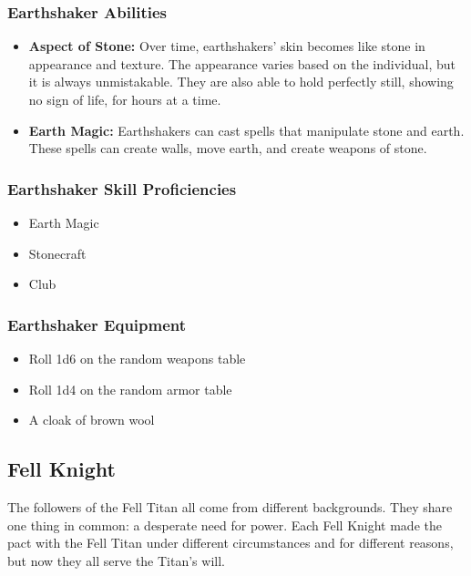 \begin{multicols}{2}
\subsubsection{Earthshaker Abilities}

\begin{itemize}
  \item \textbf{Aspect of Stone:} Over time, earthshakers' skin becomes like stone
    in appearance and texture. The appearance varies based on the individual,
    but it is always unmistakable. They are also able to hold perfectly still,
    showing no sign of life, for hours at a time.
  \item \textbf{Earth Magic:} Earthshakers can cast spells that manipulate stone
    and earth. These spells can create walls, move earth, and create weapons of
    stone.
\end{itemize}

\subsubsection{Earthshaker Skill Proficiencies}

\begin{itemize}
  \item Earth Magic
  \item Stonecraft
  \item Club
\end{itemize}

\subsubsection{Earthshaker Equipment}

\begin{itemize}
  \item Roll 1d6 on the random weapons table
  \item Roll 1d4 on the random armor table
  \item A cloak of brown wool
\end{itemize}

\subsection{Fell Knight}

The followers of the Fell Titan all come from different backgrounds.
They share one thing in common: a desperate need for power. Each Fell
Knight made the pact with the Fell Titan under different circumstances
and for different reasons, but now they all serve the Titan's will.


\end{multicols}
